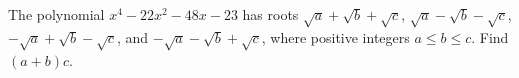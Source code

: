 The polynomial $x^4-22x^2-48x-23$ has roots $\sqrt a+\sqrt b+\sqrt c$, $\sqrt a-\sqrt b-\sqrt c$, $-\sqrt a+\sqrt b-\sqrt c$, and $-\sqrt a-\sqrt b+\sqrt c$, where positive integers $a\le b\le c$. Find $(a+b)c$.
